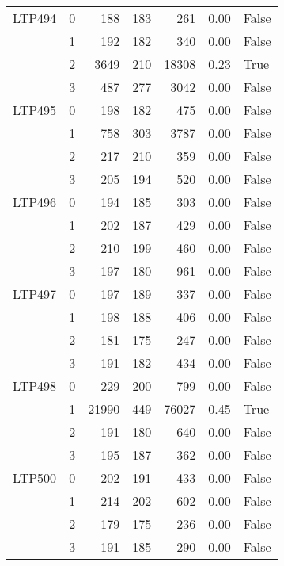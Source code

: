 \begin{longtable}{llrrrrl}
LTP494 & 0 &                      188 &    183 &     261 &     0.00 &    False \\
       & 1 &                      192 &    182 &     340 &     0.00 &    False \\
       & 2 &                     3649 &    210 &   18308 &     0.23 &     True \\
       & 3 &                      487 &    277 &    3042 &     0.00 &    False \\
LTP495 & 0 &                      198 &    182 &     475 &     0.00 &    False \\
       & 1 &                      758 &    303 &    3787 &     0.00 &    False \\
       & 2 &                      217 &    210 &     359 &     0.00 &    False \\
       & 3 &                      205 &    194 &     520 &     0.00 &    False \\
LTP496 & 0 &                      194 &    185 &     303 &     0.00 &    False \\
       & 1 &                      202 &    187 &     429 &     0.00 &    False \\
       & 2 &                      210 &    199 &     460 &     0.00 &    False \\
       & 3 &                      197 &    180 &     961 &     0.00 &    False \\
LTP497 & 0 &                      197 &    189 &     337 &     0.00 &    False \\
       & 1 &                      198 &    188 &     406 &     0.00 &    False \\
       & 2 &                      181 &    175 &     247 &     0.00 &    False \\
       & 3 &                      191 &    182 &     434 &     0.00 &    False \\
LTP498 & 0 &                      229 &    200 &     799 &     0.00 &    False \\
       & 1 &                    21990 &    449 &   76027 &     0.45 &     True \\
       & 2 &                      191 &    180 &     640 &     0.00 &    False \\
       & 3 &                      195 &    187 &     362 &     0.00 &    False \\
LTP500 & 0 &                      202 &    191 &     433 &     0.00 &    False \\
       & 1 &                      214 &    202 &     602 &     0.00 &    False \\
       & 2 &                      179 &    175 &     236 &     0.00 &    False \\
       & 3 &                      191 &    185 &     290 &     0.00 &    False \\
\end{longtable}
